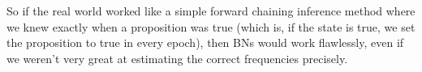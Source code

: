 So if the real world worked like a simple forward chaining inference method where we knew exactly when a proposition was true (which is, if the state is true, we set the proposition to true in every epoch), then BNs would work flawlessly, even if we weren't very great at estimating the correct frequencies precisely.






